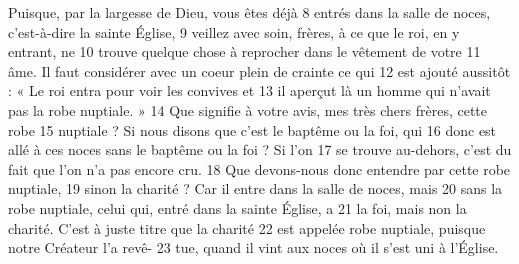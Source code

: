 Puisque, par la largesse de Dieu, vous êtes déjà	 
8	 	entrés dans la salle de noces, c'est-à-dire la sainte Église,	 
9	 	veillez avec soin, frères, à ce que le roi, en y entrant, ne	 
10	 	trouve quelque chose à reprocher dans le vêtement de votre	 
11	 	âme. Il faut considérer avec un coeur plein de crainte ce qui	 
12	 	est ajouté aussitôt : « Le roi entra pour voir les convives et	 
13	 	il aperçut là un homme qui n'avait pas la robe nuptiale. »	 
14	 	Que signifie à votre avis, mes très chers frères, cette robe	 
15	 	nuptiale ? Si nous disons que c'est le baptême ou la foi, qui	 
16	 	donc est allé à ces noces sans le baptême ou la foi ? Si l'on	 
17	 	se trouve au-dehors, c'est du fait que l'on n'a pas encore cru.	 
18	 	Que devons-nous donc entendre par cette robe nuptiale,	 
19	 	sinon la charité ? Car il entre dans la salle de noces, mais	 
20	 	sans la robe nuptiale, celui qui, entré dans la sainte Église, a	 
21	 	la foi, mais non la charité. C'est à juste titre que la charité	 
22	 	est appelée robe nuptiale, puisque notre Créateur l'a revê-	 
23	 	tue, quand il vint aux noces où il s'est uni à l'Église.